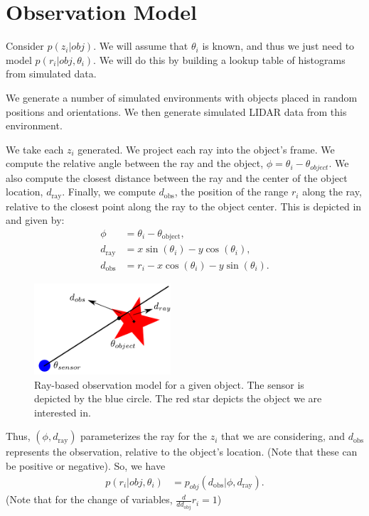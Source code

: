 \section{Observation Model}

Consider $p( z_i | obj)$. We will assume that $\theta_i$ is known, and thus we
just need to model $p( r_i | obj, \theta_i)$. We will do this by building a
lookup table of histograms from simulated data.

We generate a number of simulated environments with objects placed in random
positions and orientations. We then generate simulated LIDAR data from this
environment.

We take each $z_i$ generated. We project each ray into the object's frame. We
compute the relative angle between the ray and the object, $\phi = \theta_i -
\theta_{object}$. We also compute the closest distance between the ray and the
center of the object location, $d_{\text{ray}}$. Finally, we compute
$d_{\text{obs}}$, the position of the range $r_i$ along the ray, relative to the
closest point along the ray to the object center. This is depicted in
 and given by:
%
\begin{align}
  \phi            &= \theta_i  - \theta_{\text{object}}        \text{,} \\
  d_{\text{ray}}  &= x \sin(\theta_i) - y \cos(\theta_i)       \text{,} \\
  d_{\text{obs}}  &= r_i - x \cos(\theta_i) - y \sin(\theta_i) \text{.}
\end{align}
%
\begin{figure}
  \centering
  \includegraphics[width=2in]{figures/ray_model.pdf}
  \caption{Ray-based observation model for a given object. The sensor is
    depicted by the blue circle. The red star depicts the object we are
    interested in.}
  \label{fig:obs_model}
\end{figure}
%
Thus, $(\phi, d_{\text{ray}})$ parameterizes the ray for the $z_i$ that we are
considering, and $d_{\text{obs}}$ represents the observation, relative to the
object's location. (Note that these can be positive or negative). So, we have
%
\begin{align}
  p( r_i | obj, \theta_i) &=
    p_{obj}( d_{\text{obs}} | \phi, d_{\text{ray}} )
  \text{.}
\end{align}
%
(Note that for the change of variables, $\frac{d}{d d_{\text{obj}}} r_i = 1$)


